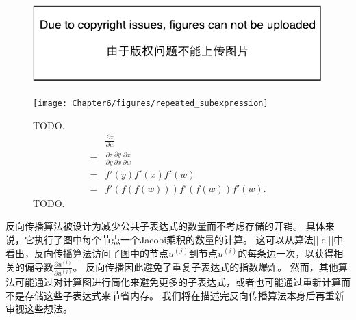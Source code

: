 \begin{figure}[!htb]
\ifOpenSource
\centerline{\includegraphics{figure.pdf}}
\else
\centerline{\texttt{[image: Chapter6/figures/repeated\_subexpression]}}
\fi
\captionsetup{singlelinecheck=off}
\caption[.]{
TODO.
\begin{align}
& \frac{\partial z}{\partial w}\\
=& \frac{\partial z}{\partial y} \frac{\partial y}{\partial x} \frac{\partial x}{\partial w}\\
=& f'(y)f'(x)f'(w)\\
=& f'(f(f(w))) f'(f(w)) f'(w).
\end{align}
TODO.}
\label{fig:chap6_repeated_subexpression}
\end{figure}


反向传播算法被设计为减少公共子表达式的数量而不考虑存储的开销。
具体来说，它执行了图中每个节点一个Jacobi乘积的数量的计算。
这可以从算法|||c|||中看出，反向传播算法访问了图中的节点$u^{(j)}$到节点$u^{(i)}$的每条边一次，以获得相关的偏导数$\frac{\partial u^{(i)}}{\partial u^{(j)}}$。
反向传播因此避免了重复子表达式的指数爆炸。
然而，其他算法可能通过对计算图进行简化来避免更多的子表达式，或者也可能通过重新计算而不是存储这些子表达式来节省内存。
我们将在描述完反向传播算法本身后再重新审视这些想法。

